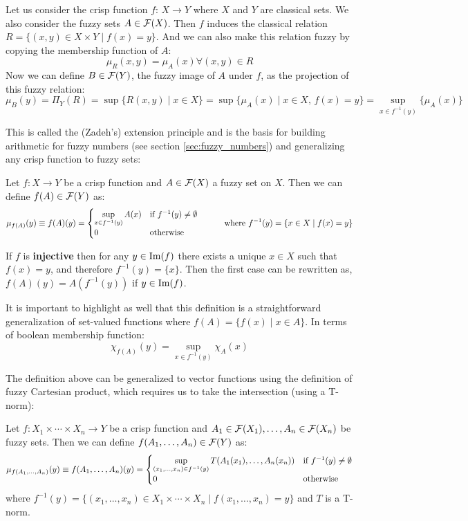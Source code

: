 Let us consider the crisp function $f:\,X \longrightarrow Y$ where $X$ and $Y$ are classical sets. We also consider the fuzzy sets $A \in \mathcal{F}(X)$. Then $f$ induces the classical relation $R=\{(x,y)\in X\times Y \mid f(x)=y\}$. And we can also make this relation fuzzy by copying the membership function of $A$:
$$ \mu_R (x,y) = \mu_A (x) \forall (x,y)\in R$$
Now we can define $B\in\mathcal{F}(Y)$, the fuzzy image of $A$ under $f$, as the projection of this fuzzy relation:
$$\mu_B (y) = \Pi_Y (R) = \sup\{R(x,y)\mid x\in X\} = \sup\{\mu_A (x)\mid x\in X, \, f(x)= y\} = \sup_{x\in f^{-1}(y)}\{\mu_A(x)\}$$

This is called the (Zadeh's) extension principle and is the basis for building arithmetic for fuzzy numbers (see section \ref{sec:fuzzy_numbers}) and generalizing any crisp function to fuzzy sets: 

\begin{definition}
  Let $f: X \longrightarrow Y$ be a crisp function and $A\in \mathcal{F}(X)$ a fuzzy set on $X$. Then we can define $f(A)\in \mathcal{F}(Y)$ as:
  \[
  \mu_{f(A)}(y)\equiv f(A)(y) = 
  \begin{cases}
    \sup_{x\in f^{-1}(y)}A(x) & \textnormal{if } f^{-1}(y)\neq \emptyset\\
    0 & \textnormal{otherwise}
  \end{cases}
  \quad\quad\quad \textnormal{where } f^{-1}(y)=\{x\in X \mid f(x)=y\}
  \]
\end{definition}


\begin{remark}
  If $f$ is \textbf{injective} then for any $y \in \textnormal{Im}(f)$ there exists a unique $x \in X$ such that $f(x)=y$, and therefore $f^{-1}(y)=\{x\}$. Then the first case can be rewritten as, $f(A)(y) = A(f^{-1}(y))$ if $y \in \textnormal{Im}(f)$.
\end{remark}

It is important to highlight as well that this definition is a straightforward generalization of set-valued functions where $f(A)= \{f(x)\mid x\in A\}$. In terms of boolean membership function:
$$\chi _{f(A)}(y)=\sup_{x\in f^{-1}(y)}\chi_A(x)$$

The definition above can be generalized to vector functions using the definition of fuzzy Cartesian product, which requires us to take the intersection (using a T-norm):

\begin{definition}
  Let $f: X_1 \times \cdots \times X_n \longrightarrow Y$ be a crisp function and $A_1 \in \mathcal{F}(X_1), \ldots, A_n \in \mathcal{F}(X_n)$ be fuzzy sets. Then we can define $f(A_1,\ldots,A_n)\in \mathcal{F}(Y)$ as:
  \[
  \mu_{f(A_1,\ldots,A_n)}(y)\equiv f(A_1,\ldots,A_n)(y) = 
  \begin{cases}
    \sup_{(x_1,\ldots,x_n)\in f^{-1}(y)} T(A_1(x_1),\ldots,A_n(x_n)) & \textnormal{if } f^{-1}(y)\neq \emptyset\\
    0 & \textnormal{otherwise}
  \end{cases}
  \]
  where $f^{-1}(y)=\{(x_1,\ldots,x_n)\in X_1\times\cdots\times X_n \mid f(x_1,\ldots,x_n)=y\}$ and $T$ is a T-norm.
\end{definition}

